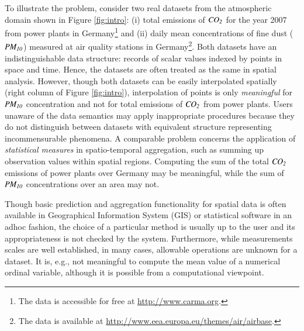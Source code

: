 \documentclass[final,authoryear,1p,times]{elsarticle}
\begin{document}
To illustrate the problem, consider two real datasets from the atmospheric domain shown in Figure \ref{fig:intro}: (i) total emissions of ${\it CO_2}$ for the year 2007 from power plants in Germany\footnote{The data is accessible for free at \url{http://www.carma.org}.} and (ii) daily mean concentrations of fine dust (${\it PM_{10}}$) measured at air quality stations in Germany\footnote{The data is available at \url{http://www.eea.europa.eu/themes/air/airbase}.}. Both datasets have an indistinguishable data structure: records of scalar values indexed by points in space and time. Hence, the datasets are often treated as the same in spatial analysis. However, though both datasets can be easily interpolated spatially (right column of Figure \ref{fig:intro}), interpolation of points is only \textit{meaningful} for ${\it PM_{10}}$ concentration and not for total emissions of ${\it CO_2}$ from power plants. Users unaware of the data semantics may apply inappropriate procedures because they do not distinguish between datasets with equivalent structure representing incommensurable phenomena. 
A comparable problem concerns the application of \textit{statistical measures} in spatio-temporal aggregation, such as summing up observation values within spatial regions. Computing the sum of the total ${\it CO_2}$ emissions of power plants over Germany may be meaningful, while the sum of ${\it PM_{10}}$ concentrations over an area may not. 

Though basic prediction and aggregation functionality for spatial data is often available in Geographical Information System (GIS) or statistical software in an adhoc fashion, the choice of a particular method is usually up to the user and its appropriateness is not checked by the system. Furthermore, while measurements scales \citep{Stevens1946,Suppes1967,Chrisman1995} are well established, in many cases, allowable operations are unknown for a dataset. It is, e.g., not meaningful to compute the mean value of a numerical ordinal variable, although it is possible from a computational viewpoint. 
\end{document}
